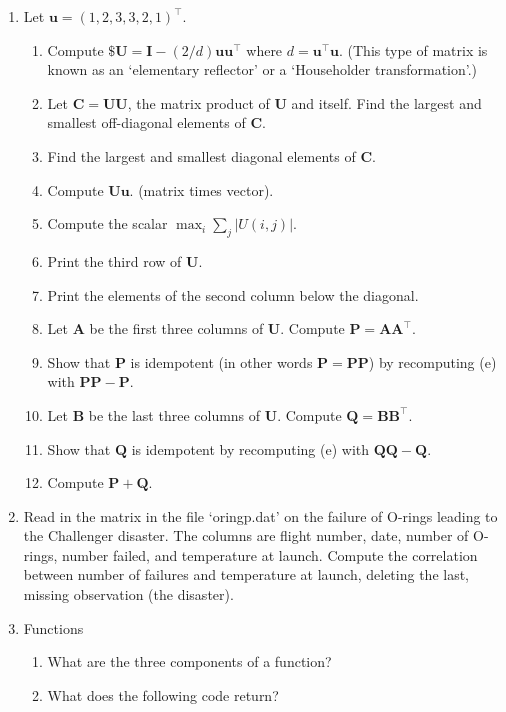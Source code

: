 \documentclass[12pt]{report}
\newcommand{\Vec}[1]{\bm{#1}}
\begin{document}
\begin{enumerate}
\item Let $\Vec{u} = (1, 2, 3, 3, 2, 1)^\top$.  
    \begin{enumerate}[label={\alph*}]
        \item Compute $\$\Vec{U} = \Vec{I} - (2/d) \Vec{u} \Vec{u}^\top$ where $d = \Vec{u}^\top \Vec{u}$.  (This type of matrix is known as an `elementary reflector' or a `Householder transformation'.)
        \item Let $\Vec{C} = \Vec{U}  \Vec{U}$, the matrix product of $\Vec{U}$ and itself.  Find the largest and smallest off-diagonal elements of $\Vec{C}$.
        \item Find the largest and smallest diagonal elements of $\Vec{C}$.
        \item Compute $\Vec{U} \Vec{u}$.  (matrix times vector).
        \item Compute the scalar $\max_i \sum_j |U(i, j)| $.
        \item Print the third row of $\Vec{U}$.
        \item Print the elements of the second column below the diagonal.
        \item Let $\Vec{A}$ be the first three columns of $\Vec{U}$.  Compute $\Vec{P} = \Vec{A} \Vec{A}^\top$.
        \item Show that $\Vec{P}$ is idempotent (in other words $\Vec{P} = \Vec{P}\Vec{P}$) by recomputing (e) with $\Vec{P}\Vec{P} - \Vec{P}$.
        \item Let $\Vec{B}$ be the last three columns of $\Vec{U}$.  Compute $\Vec{Q} = \Vec{B}\Vec{B}^\top$.
        \item Show that $\Vec{Q}$ is idempotent by recomputing (e) with $\Vec{Q} \Vec{Q} - \Vec{Q}$.
        \item Compute $\Vec{P} + \Vec{Q}$.
    \end{enumerate}
    
\item Read in the matrix in the file `oringp.dat' on the failure of O-rings leading to the Challenger disaster.
The columns are flight number, date, number of O-rings, number failed, and temperature at launch.
Compute the correlation between number of failures and temperature at launch, deleting the last, missing observation (the disaster).

\item Functions
    \begin{enumerate}[label={\alph*}]
        \item What are the three components of a function?
        \item What does the following code return?


\end{enumerate}
\end{enumerate}
\end{document}
